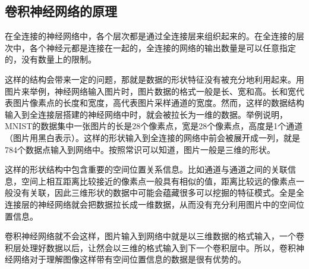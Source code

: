 \subsection{卷积神经网络的原理}
在全连接的神经网络中，各个层次都是通过全连接层来组织起来的。在全连接的层次中，各个神经元都是连接在一起的，全连接的网络的输出数量是可以任意指定的，没有数量上的限制。

这样的结构会带来一定的问题，那就是数据的形状特征没有被充分地利用起来。用图片来举例，神经网络输入图片时，图片数据的格式一般是长、宽和高。长和宽代表图片像素点的长度和宽度，高代表图片采样通道的宽度。然而，这样的数据结构输入到全连接层搭建的神经网络中时，就会被拉长为一维的数据。举例说明，MNIST的数据集中一张图片的长是28个像素点，宽是28个像素点，高度是1个通道（图片用黑白表示）。这样的形状输入到全连接的网络中前会被展开成一列，就是784个数据点输入到网络中。按照常识可以知道，图片一般是三维的形状。

这样的形状结构中包含重要的空间位置关系信息。比如通道与通道之间的关联信息，空间上相互距离比较接近的像素点一般具有相似的值，距离比较远的像素点一般没有关联，因此三维形状的数据中可能会蕴藏很多可以挖掘的特征模式。全是全连接层的神经网络就会把数据拉长成一维数据，从而没有充分利用图片中的空间位置信息。

卷积神经网络就不会这样，图片输入到网络中就是以三维数据的格式输入，一个卷积层处理好数据以后，让然会以三维的格式输入到下一个卷积层中。所以，卷积神经网络对于理解图像这样带有空间位置信息的数据是很有优势的。
